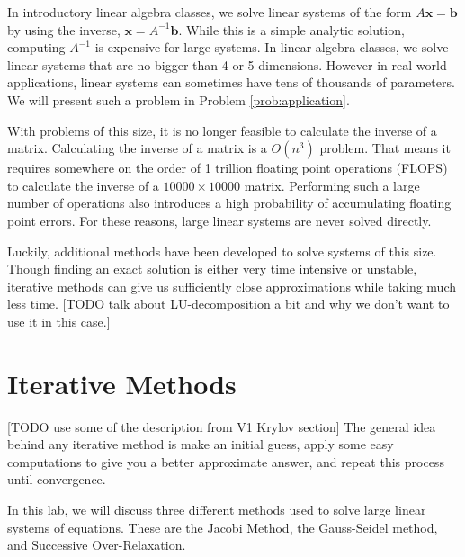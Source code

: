 \label{lab:iter_methods}


In introductory linear algebra classes, we solve linear systems of the form
$A\mathbf{x} = \mathbf{b}$ by using the inverse, $\mathbf{x} = A^{-1}\mathbf{b}$.
While this is a simple analytic solution, computing $A^{-1}$ is expensive for
large systems.
In linear algebra classes, we solve linear systems that are no bigger than 4 or 5
dimensions. However in real-world applications, linear systems can sometimes have
tens of thousands of parameters. We will present such a problem in
Problem \ref{prob:application}.

With problems of this size, it is no longer feasible to calculate the inverse of
a matrix. Calculating the inverse of a matrix is a $O(n^3)$ problem.
That means it requires somewhere on the order
of 1 trillion floating point operations (FLOPS) to calculate the inverse of a
$10000 \times 10000$ matrix. Performing such a large number of operations also
introduces a high probability of accumulating floating point errors. For these
reasons, large linear systems are never solved directly.

Luckily, additional methods have been developed to solve systems of this size.
Though finding an exact solution is either very time intensive or unstable,
iterative methods can give us sufficiently close approximations while taking
much less time. [TODO talk about LU-decomposition a bit and why we don't want
to use it in this case.]

\section*{Iterative Methods}

[TODO use some of the description from V1 Krylov section]
The general idea behind any iterative method is make an initial guess, apply some
easy computations to give you a better approximate answer,
and repeat this process until convergence.

In this lab, we will discuss three different methods used to solve large linear
systems of equations. These are the Jacobi Method, the Gauss-Seidel method, and
Successive Over-Relaxation.

